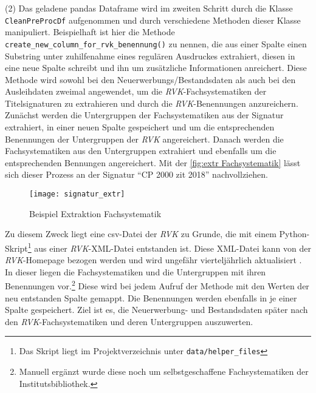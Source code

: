     (2) Das geladene pandas Dataframe wird im zweiten Schritt durch die Klasse \texttt{CleanPreProcDf} aufgenommen und durch verschiedene Methoden dieser Klasse
    manipuliert. Beispielhaft ist hier die Methode \texttt{create\_new\_column\_for\_rvk\_benennung()} zu nennen, die aus einer Spalte einen Substring unter
    zuhilfenahme eines regulären Ausdruckes extrahiert, diesen in eine neue Spalte schreibt und ihn um zusätzliche Informationen anreichert. 
    Diese Methode wird sowohl bei den Neuerwerbungs/Bestandsdaten als auch bei den Ausleihdaten zweimal angewendet, um die  \textit{\acrshort{RVK}}-Fachsystematiken der
    Titelsignaturen zu extrahieren und durch die \textit{\acrshort{RVK}}-Benennungen anzureichern. 
    Zunächst werden die Untergruppen der Fachsystematiken aus der Signatur extrahiert, in einer neuen Spalte gespeichert und um die entsprechenden Benennungen der Untergruppen der 
    \textit{\acrshort{RVK}} angereichert. 
    Danach werden die Fachsystematiken aus den Untergruppen extrahiert und ebenfalls um die entsprechenden Bennungen angereichert.
    Mit der \autoref{fig:extr Fachsystematik} lässt sich dieser Prozess an der Signatur \enquote{CP 2000 zit 2018} nachvollziehen.
    \begin{figure}[H]
        \centering
            \texttt{[image: signatur\_extr]}
            \caption{Beispiel Extraktion Fachsystematik}
            \label{fig:extr Fachsystematik}
    \end{figure}

    Zu diesem Zweck liegt eine csv-Datei der \textit{\acrshort{RVK}} zu Grunde, die mit einem Python-Skript\footnote{Das Skript liegt im Projektverzeichnis
    unter \texttt{data/helper\_files}} aus einer \textit{\acrshort{RVK}}-XML-Datei entstanden ist.
    Diese XML-Datei kann von der \textit{\acrshort{RVK}}-Homepage bezogen werden und wird ungefähr vierteljährlich aktualisiert \cite[Vgl.][]{rvk_rvk_2021}.
    In dieser liegen die Fachsystematiken und die Untergruppen mit ihren Benennungen vor.\footnote{Manuell ergänzt wurde diese noch um selbstgeschaffene Fachsystematiken der Institutsbibliothek.}
    Diese wird bei jedem Aufruf der Methode mit den Werten der neu entstanden Spalte gemappt. Die Benennungen werden ebenfalls in je einer Spalte gespeichert.
    Ziel ist es, die Neuerwerbung- und Bestandsdaten später nach den \textit{\acrshort{RVK}}-Fachsystematiken und deren Untergruppen auszuwerten.
    
